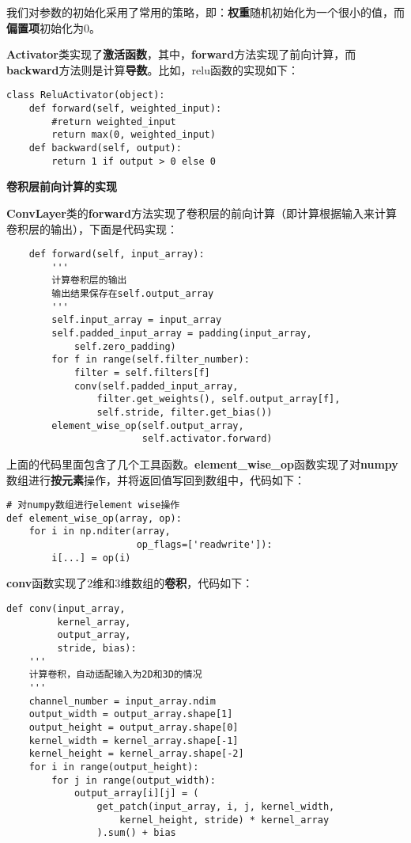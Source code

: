 我们对参数的初始化采用了常用的策略，即：\textbf{权重}随机初始化为一个很小的值，而\textbf{偏置项}初始化为0。

\textbf{Activator}类实现了\textbf{激活函数}，其中，\textbf{forward}方法实现了前向计算，而\textbf{backward}方法则是计算\textbf{导数}。比如，relu函数的实现如下：
\begin{lstlisting}
class ReluActivator(object):
    def forward(self, weighted_input):
        #return weighted_input
        return max(0, weighted_input)
    def backward(self, output):
        return 1 if output > 0 else 0
\end{lstlisting}

\textbf{卷积层前向计算的实现}

\textbf{ConvLayer}类的\textbf{forward}方法实现了卷积层的前向计算（即计算根据输入来计算卷积层的输出），下面是代码实现：
\begin{lstlisting}
    def forward(self, input_array):
        '''
        计算卷积层的输出
        输出结果保存在self.output_array
        '''
        self.input_array = input_array
        self.padded_input_array = padding(input_array,
            self.zero_padding)
        for f in range(self.filter_number):
            filter = self.filters[f]
            conv(self.padded_input_array, 
                filter.get_weights(), self.output_array[f],
                self.stride, filter.get_bias())
        element_wise_op(self.output_array, 
                        self.activator.forward)
\end{lstlisting}

上面的代码里面包含了几个工具函数。\textbf{element\_wise\_op}函数实现了对\textbf{numpy}数组进行\textbf{按元素}操作，并将返回值写回到数组中，代码如下：
\begin{lstlisting}
# 对numpy数组进行element wise操作
def element_wise_op(array, op):
    for i in np.nditer(array,
                       op_flags=['readwrite']):
        i[...] = op(i)
\end{lstlisting}

\textbf{conv}函数实现了2维和3维数组的\textbf{卷积}，代码如下：
\begin{lstlisting}
def conv(input_array, 
         kernel_array,
         output_array, 
         stride, bias):
    '''
    计算卷积，自动适配输入为2D和3D的情况
    '''
    channel_number = input_array.ndim
    output_width = output_array.shape[1]
    output_height = output_array.shape[0]
    kernel_width = kernel_array.shape[-1]
    kernel_height = kernel_array.shape[-2]
    for i in range(output_height):
        for j in range(output_width):
            output_array[i][j] = (    
                get_patch(input_array, i, j, kernel_width, 
                    kernel_height, stride) * kernel_array
                ).sum() + bias
\end{lstlisting}

